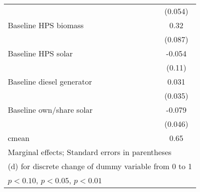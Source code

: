 \begin{table}[htbp]
\begin{tabular*}{1\hsize}{@{\hskip\tabcolsep\extracolsep\fill}l*{5}{c}}
                &                  &                  &                  &                  &  (0.054)         \\
Baseline HPS biomass&                  &                  &                  &                  &     0.32\sym{***}\\
                &                  &                  &                  &                  &  (0.087)         \\
Baseline HPS solar&                  &                  &                  &                  &   -0.054         \\
                &                  &                  &                  &                  &   (0.11)         \\
Baseline diesel generator&                  &                  &                  &                  &    0.031         \\
                &                  &                  &                  &                  &  (0.035)         \\
Baseline own/share solar&                  &                  &                  &                  &   -0.079\sym{*}  \\
                &                  &                  &                  &                  &  (0.046)         \\
\midrule
cmean           &                  &                  &                  &                  &     0.65         \\
\bottomrule
\multicolumn{6}{l}{\footnotesize Marginal effects; Standard errors in parentheses}\\
\multicolumn{6}{l}{\footnotesize  (d) for discrete change of dummy variable from 0 to 1}\\
\multicolumn{6}{l}{\footnotesize \sym{*} \(p<0.10\), \sym{**} \(p<0.05\), \sym{***} \(p<0.01\)}\\
\end{tabular*}
\end{table}
